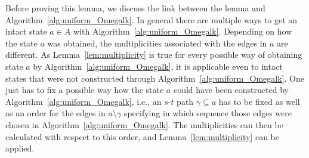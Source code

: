 \documentclass{article}
\begin{document}
Before proving this lemma, we discuss the link between the lemma
and Algorithm~\ref{alg:uniform_Omegalk}. In general there
are multiple ways to get an intact state $a\in A$ with
Algorithm~\ref{alg:uniform_Omegalk}. Depending on how the
state $a$ was obtained, the multiplicities associated with
the edges in $a$ are different. As
Lemma~\ref{lem:multiplicity} is true for every possible way
of obtaining state $a$ by Algorithm~\ref{alg:uniform_Omegalk}, it
is applicable even to intact states that were not
constructed through Algorithm~\ref{alg:uniform_Omegalk}. One
just has to fix a possible way how the state $a$ could have
been constructed by Algorithm~\ref{alg:uniform_Omegalk},
i.e., an $s$-$t$ path $\gamma\subseteq a$ has to be fixed as well
as an order for the edges in $a\setminus\gamma$ specifying in
which sequence those edges were chosen in
Algorithm~\ref{alg:uniform_Omegalk}.
The multiplicities can then be calculated with respect to this order, and
Lemma~\ref{lem:multiplicity} can be applied.
\end{document}
